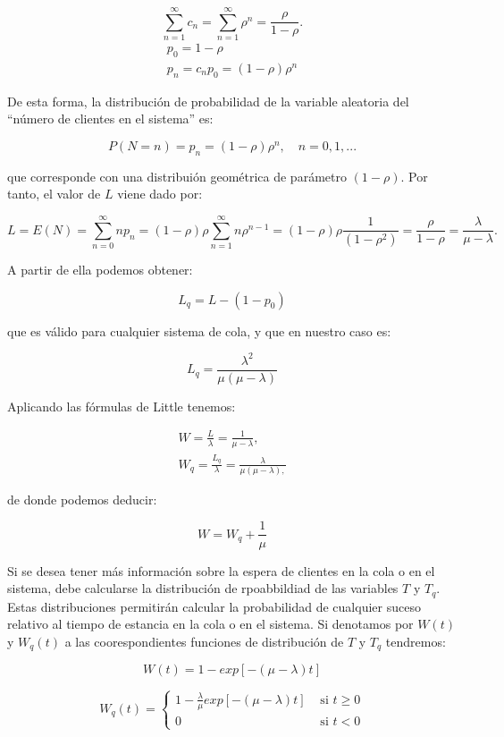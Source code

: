 \documentclass[
]{book}
\theoremstyle{definition}
\theoremstyle{definition}
\theoremstyle{definition}
\theoremstyle{definition}
\theoremstyle{remark}
\begin{document}
\[\sum_{n = 1}^{\infty} c_n = \sum_{n = 1}^{\infty} \rho^n = \frac{\rho}{1-\rho}.\]
\[
\begin{matrix}
p_0 = 1 - \rho\\
p_n = c_np_0 = (1 - \rho)\rho^n
\end{matrix}\]

De esta forma, la distribución de probabilidad de la variable aleatoria del ``número de clientes en el sistema'' es:

\[P(N = n) = p_n = (1-\rho)\rho^n, \quad n = 0, 1,...\]

que corresponde con una distribuión geométrica de parámetro \((1 - \rho)\). Por tanto, el valor de \(L\) viene dado por:

\[L = E(N) = \sum_{n = 0}^{\infty} np_n = (1 - \rho)\rho \sum_{n = 1}^{\infty} n \rho^{n-1} = (1 - \rho)\rho\frac{1}{(1 - \rho^2)} = \frac{\rho}{1 - \rho} = \frac{\lambda}{\mu - \lambda}.\]

A partir de ella podemos obtener:

\[L_q = L - (1 - p_0)\]

que es válido para cualquier sistema de cola, y que en nuestro caso es:

\[L_q = \frac{\lambda^2}{\mu(\mu-\lambda)}\]

Aplicando las fórmulas de Little tenemos:

\[
\begin{matrix}
W = \frac{L}{\lambda} = \frac{1}{\mu - \lambda},\\
W_q = \frac{L_q}{\lambda} = \frac{\lambda}{\mu(\mu - \lambda),}
\end{matrix}\]

de donde podemos deducir:

\[W = W_q + \frac{1}{\mu}\]

Si se desea tener más información sobre la espera de clientes en la cola o en el sistema, debe calcularse la distribución de rpoabbildiad de las variables \(T\) y \(T_q\). Estas distribuciones permitirán calcular la probabilidad de cualquier suceso relativo al tiempo de estancia en la cola o en el sistema. Si denotamos por \(W(t)\) y \(W_q(t)\) a las coorespondientes funciones de distribución de \(T\) y \(T_q\) tendremos:

\[W(t) = 1 - exp[-(\mu - \lambda)t]\]

\[
W_q(t) =
\begin{cases}
1 - \frac{\lambda}{\mu}exp[-(\mu - \lambda)t] & \text{ si } t \geq 0\\
0 & \text{ si } t < 0
\end{cases}
\]
\end{document}
